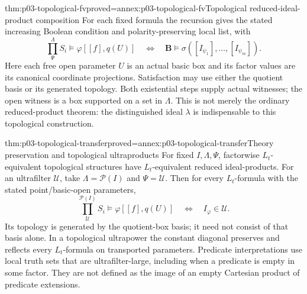 \begin{hbtheorem}{thm:p03-topological-fv}{proved=annex:p03-topological-fv}{Topological reduced-ideal-product composition}
For each fixed formula the recursion gives the stated increasing Boolean
condition and polarity-preserving local list, with
\[
 \prod^\Lambda_\Psi S_i\models\varphi[[f],q(U)]
          \quad\Longleftrightarrow\quad
             \mathbf B\models\sigma([I_{\psi_1}],\ldots,[I_{\psi_m}]).
\]
Here each free open parameter \(U\) is an actual basic box and its factor
values are its canonical coordinate projections. Satisfaction may use
either the quotient basis or its generated topology. Both existential
steps supply actual witnesses; the open witness is a box supported on a
set in \(\Lambda\). This is not merely the ordinary reduced-product
theorem: the distinguished ideal \(\lambda\) is indispensable to this
topological construction.
\end{hbtheorem}

\begin{hbcorollary}{thm:p03-topological-transfer}{proved=annex:p03-topological-transfer}{Theory preservation and topological ultraproducts}
For fixed \(I,\Lambda,\Psi\), factorwise \(L_t\)-equivalent
topological structures have \(L_t\)-equivalent reduced ideal-products.
For an ultrafilter \(\mathcal U\), take
\(\Lambda=\mathcal P(I)\) and \(\Psi=\mathcal U\).
Then for every \(L_t\)-formula with the stated point/basic-open
parameters,
\[
       \prod^{\mathcal P(I)}_{\mathcal U}S_i\models\varphi[[f],q(U)]
          \quad\Longleftrightarrow\quad I_\varphi\in\mathcal U.
\]
Its topology is generated by the quotient-box basis; it need not consist
of that basis alone. In a topological ultrapower the constant diagonal
preserves and reflects every \(L_t\)-formula on transported parameters.
Predicate interpretations use local truth sets that are ultrafilter-large,
including when a predicate is empty in some factor. They are not defined
as the image of an empty Cartesian product of predicate extensions.
\end{hbcorollary}
